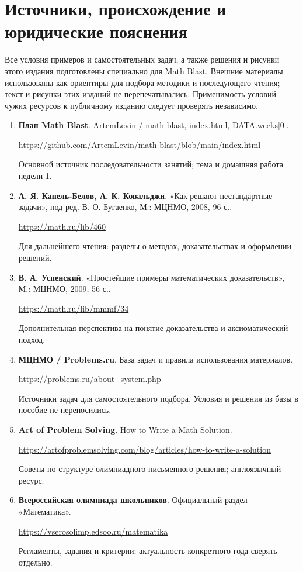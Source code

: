 \documentclass[11pt,a4paper,openany]{book}
\begin{document}
\chapter{Источники, происхождение и юридические пояснения}
Все условия примеров и самостоятельных задач, а также решения и рисунки этого издания подготовлены специально для Math Blast. Внешние материалы использованы как ориентиры для подбора методики и последующего чтения; текст и рисунки этих изданий не перепечатывались. Применимость условий чужих ресурсов к публичному изданию следует проверять независимо.
\begin{enumerate}

\item \textbf{План Math Blast}. ArtemLevin / math-blast, index.html, DATA.weeks[0].\par \url{https://github.com/ArtemLevin/math-blast/blob/main/index.html}\par Основной источник последовательности занятий; тема и домашняя работа недели 1.

\item \textbf{А. Я. Канель-Белов, А. К. Ковальджи}. «Как решают нестандартные задачи», под ред. В. О. Бугаенко, М.: МЦНМО, 2008, 96 с..\par \url{https://math.ru/lib/460}\par Для дальнейшего чтения: разделы о методах, доказательствах и оформлении решений.

\item \textbf{В. А. Успенский}. «Простейшие примеры математических доказательств», М.: МЦНМО, 2009, 56 с..\par \url{https://math.ru/lib/mmmf/34}\par Дополнительная перспектива на понятие доказательства и аксиоматический подход.

\item \textbf{МЦНМО / Problems.ru}. База задач и правила использования материалов.\par \url{https://problems.ru/about_system.php}\par Источники задач для самостоятельного подбора. Условия и решения из базы в пособие не переносились.

\item \textbf{Art of Problem Solving}. How to Write a Math Solution.\par \url{https://artofproblemsolving.com/blog/articles/how-to-write-a-solution}\par Советы по структуре олимпиадного письменного решения; англоязычный ресурс.

\item \textbf{Всероссийская олимпиада школьников}. Официальный раздел «Математика».\par \url{https://vserosolimp.edsoo.ru/matematika}\par Регламенты, задания и критерии; актуальность конкретного года сверять отдельно.

\end{enumerate}
\end{document}
